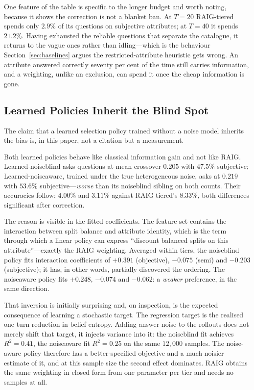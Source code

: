 One feature of the table is specific to the longer budget and worth noting,
because it shows the correction is not a blanket ban. At $T=20$ RAIG-tiered
spends only $2.9\%$ of its questions on subjective attributes; at $T=40$ it
spends $21.2\%$. Having exhausted the reliable questions that separate the
catalogue, it returns to the vague ones rather than idling---which is the
behaviour Section~\ref{sec:baselines} argues the restricted-attribute
heuristic gets wrong. An attribute answered correctly seventy per cent of the
time still carries information, and a weighting, unlike an exclusion, can spend
it once the cheap information is gone.

\subsection{Learned Policies Inherit the Blind Spot}
\label{sec:results-learned}

The claim that a learned selection policy trained without a noise model
inherits the bias is, in this paper, not a citation but a measurement.

Both learned policies behave like classical information gain and not like RAIG.
Learned-noiseblind asks questions at mean crossover $0.205$ with $47.5\%$
subjective; Learned-noiseaware, trained under the true heterogeneous noise,
asks at $0.219$ with $53.6\%$ subjective---\emph{worse} than its noiseblind
sibling on both counts. Their accuracies follow: $4.00\%$ and $3.11\%$ against
RAIG-tiered's $8.33\%$, both differences significant after correction.

The reason is visible in the fitted coefficients. The feature set contains the
interaction between split balance and attribute identity, which is the term
through which a linear policy can express ``discount balanced splits on this
attribute''---exactly the RAIG weighting. Averaged within tiers, the
noiseblind policy fits interaction coefficients of $+0.391$ (objective),
$-0.075$ (semi) and $-0.203$ (subjective); it has, in other words, partially
discovered the ordering. The noiseaware policy fits $+0.248$, $-0.074$ and
$-0.062$: a \emph{weaker} preference, in the same direction.

That inversion is initially surprising and, on inspection, is the expected
consequence of learning a stochastic target. The regression target is the
realised one-turn reduction in belief entropy. Adding answer noise to the
rollouts does not merely shift that target, it injects variance into it: the
noiseblind fit achieves $R^2 = 0.41$, the noiseaware fit $R^2 = 0.25$ on the
same $12{,}000$ samples. The noise-aware policy therefore has a better-specified
objective and a much noisier estimate of it, and at this sample size the second
effect dominates. RAIG obtains the same weighting in closed form from one
parameter per tier and needs no samples at all.

